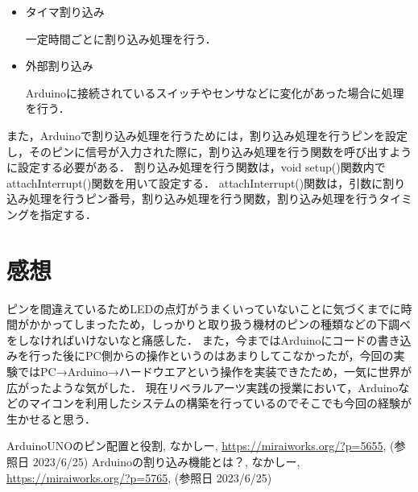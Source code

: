 \documentclass{ltjsarticle}
\begin{document}
\begin{itemize}
    \item タイマ割り込み

          一定時間ごとに割り込み処理を行う．
    \item 外部割り込み

          Arduinoに接続されているスイッチやセンサなどに変化があった場合に処理を行う．
\end{itemize}

また，Arduinoで割り込み処理を行うためには，割り込み処理を行うピンを設定し，そのピンに信号が入力された際に，割り込み処理を行う関数を呼び出すように設定する必要がある．
割り込み処理を行う関数は，void setup()関数内でattachInterrupt()関数を用いて設定する．
attachInterrupt()関数は，引数に割り込み処理を行うピン番号，割り込み処理を行う関数，割り込み処理を行うタイミングを指定する．



\section{感想}

ピンを間違えているためLEDの点灯がうまくいっていないことに気づくまでに時間がかかってしまったため，しっかりと取り扱う機材のピンの種類などの下調べをしなければいけないなと痛感した．
また，今まではArduinoにコードの書き込みを行った後にPC側からの操作というのはあまりしてこなかったが，今回の実験ではPC→Arduino→ハードウエアという操作を実装できたため，一気に世界が広がったような気がした．
現在リベラルアーツ実践の授業において，Arduinoなどのマイコンを利用したシステムの構築を行っているのでそこでも今回の経験が生かせると思う．

\begin{thebibliography}{9}
     ArduinoUNOのピン配置と役割, なかしー, \url{https://miraiworks.org/?p=5655}, (参照日 2023/6/25)
     Arduinoの割り込み機能とは？, なかしー, \url{https://miraiworks.org/?p=5765}, (参照日 2023/6/25)
\end{thebibliography}
\end{document}
